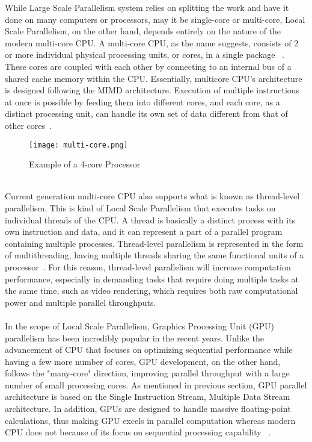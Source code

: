 While Large Scale Parallelism system relies on splitting the work and have it done on many computers or processors, may it be single-core or multi-core, Local Scale Parallelism, on the other hand, depends entirely on the nature of the modern multi-core CPU. A multi-core CPU, as the name suggests, consists of 2 or more individual physical processing units, or cores, in a single package ~\cite{multicore}. These cores are coupled with each other by connecting to an internal bus of a shared cache memory within the CPU. Essentially, multicore CPU's architecture is designed following the MIMD architecture. Execution of multiple instructions at once is possible by feeding them into different cores, and each core, as a distinct processing unit, can handle its own set of data different from that of other cores~\cite{multicore}. \\
\begin{figure}[H]
\texttt{[image: multi-core.png]}
\centering
\caption{Example of a 4-core Processor}
\end{figure}
~\\
Current generation multi-core CPU also supports what is known as thread-level parallelism. This is kind of Local Scale Parallelism that executes tasks on individual threads of the CPU. A thread is basically a distinct process with its own instruction and data, and it can represent a part of a parallel program containing multiple processes. Thread-level parallelism is represented in the form of multithreading, having multiple threads sharing the same functional units of a processor~\cite{multicore}. For this reason, thread-level parallelism will increase computation performance, especially in demanding tasks that require doing multiple tasks at the same time, such as video rendering, which requires both raw computational power and multiple parallel throughputs. \\
~\\
In the scope of Local Scale Parallelism, Graphics Processing Unit (GPU) parallelism has been incredibly popular in the recent years. Unlike the advancement of CPU that focuses on optimizing sequential performance while having a few more number of cores, GPU development, on the other hand, follows the "many-core" direction, improving parallel throughput with a large number of small processing cores. As mentioned in previous section, GPU parallel architecture is based on the Single Instruction Stream, Multiple Data Stream architecture. In addition, GPUs are designed to handle massive floating-point calculations, thus making GPU excels in parallel computation whereas modern CPU does not because of its focus on sequential processing capability ~\cite{GPU}. \\
